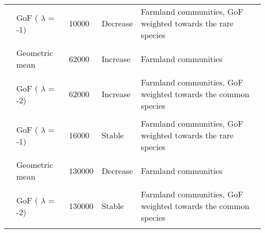 \documentclass[
  12pt,
  oneside]{report}
\begin{document}
\begin{landscape}
\begin{longtable}[t]{llll>{\raggedright\arraybackslash}p{30em}}
\cite{harrison_assessing_2014} & GoF ( $\lambda$ = -1) & 10000 & Decrease & Farmland communities, GoF weighted towards the rare species\\
\addlinespace
\cellcolor{gray!6}{\cite{harrison_assessing_2014}} & \cellcolor{gray!6}{GoF ( $\lambda$ = -2)} & \cellcolor{gray!6}{10000} & \cellcolor{gray!6}{Increase} & \cellcolor{gray!6}{Farmland communities, GoF weighted towards the common species}\\
\cite{harrison_assessing_2014} & Geometric mean & 62000 & Increase & Farmland communities\\
\cellcolor{gray!6}{\cite{harrison_assessing_2014}} & \cellcolor{gray!6}{GoF ( $\lambda$ = -1)} & \cellcolor{gray!6}{62000} & \cellcolor{gray!6}{Stable} & \cellcolor{gray!6}{Farmland communities, GoF weighted towards the rare species}\\
\cite{harrison_assessing_2014} & GoF ( $\lambda$ = -2) & 62000 & Increase & Farmland communities, GoF weighted towards the common species\\
\cellcolor{gray!6}{\cite{harrison_assessing_2014}} & \cellcolor{gray!6}{Geometric mean} & \cellcolor{gray!6}{16000} & \cellcolor{gray!6}{Stable} & \cellcolor{gray!6}{Farmland communities}\\
\addlinespace
\cite{harrison_assessing_2014} & GoF ( $\lambda$ = -1) & 16000 & Stable & Farmland communities, GoF weighted towards the rare species\\
\cellcolor{gray!6}{\cite{harrison_assessing_2014}} & \cellcolor{gray!6}{GoF ( $\lambda$ = -2)} & \cellcolor{gray!6}{16000} & \cellcolor{gray!6}{Stable} & \cellcolor{gray!6}{Farmland communities, GoF weighted towards the common species}\\
\cite{harrison_assessing_2014} & Geometric mean & 130000 & Decrease & Farmland communities\\
\cellcolor{gray!6}{\cite{harrison_assessing_2014}} & \cellcolor{gray!6}{GoF ( $\lambda$ = -1)} & \cellcolor{gray!6}{130000} & \cellcolor{gray!6}{Decrease} & \cellcolor{gray!6}{Farmland communities, GoF weighted towards the rare species}\\
\cite{harrison_assessing_2014} & GoF ( $\lambda$ = -2) & 130000 & Stable & Farmland communities, GoF weighted towards the common species\\
\addlinespace
\cellcolor{gray!6}{\cite{harrison_assessing_2014}} & \cellcolor{gray!6}{Geometric mean} & \cellcolor{gray!6}{10000} & \cellcolor{gray!6}{Increase} & \cellcolor{gray!6}{Woodland communities, supplemtary material}\\

\end{longtable}
\end{landscape}
\end{document}
